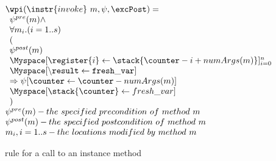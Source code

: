 \begin{figure}[!ht]
$$
\begin{array}{l}
\wpi(\instr{invoke} \ m, \psi ,\excPost) =\\ 
\begin{array}{l}
\psi^{pre}(m) \wedge \\
 \forall m_{i}. ( i = 1 .. s ) \\
 ( \\
\psi^{post}(m) \\
\Myspace [\register{i}  \leftarrow \stack{\counter - i + numArgs(m) } ]_{i=0}^n  \\
\Myspace  [\tt{\backslash result} \leftarrow fresh\_var] \\
\Rightarrow \psi[\counter \leftarrow \counter - numArgs(m)]\\
 \Myspace  [\stack{\counter }  \leftarrow fresh\_var] \\
) \\
\end{array} \\
\psi^{pre}(m) - the \ specified \ precondition \ of \ method \ m \\
\psi^{post}(m) - the \ specified \ postcondition \ of \ method \ m \\
m_{i} , i = 1 .. s - the \ locations \ modified \ by \ method \ m
\end{array}
$$
\caption{\wpi \ rule for a call to an instance method}
\label{wpInv}
\end{figure}
